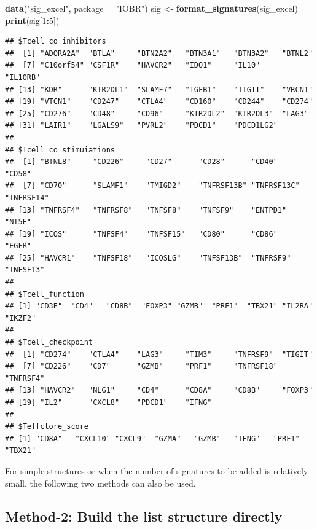 \documentclass[
  12pt,
]{book}
\newenvironment{Shaded}{\begin{snugshade}}{\end{snugshade}}
\newcommand{\AttributeTok}[1]{\textcolor[rgb]{0.13,0.29,0.53}{#1}}
\newcommand{\DecValTok}[1]{\textcolor[rgb]{0.00,0.00,0.81}{#1}}
\newcommand{\FunctionTok}[1]{\textcolor[rgb]{0.13,0.29,0.53}{\textbf{#1}}}
\newcommand{\NormalTok}[1]{#1}
\newcommand{\OtherTok}[1]{\textcolor[rgb]{0.56,0.35,0.01}{#1}}
\newcommand{\SpecialCharTok}[1]{\textcolor[rgb]{0.81,0.36,0.00}{\textbf{#1}}}
\newcommand{\StringTok}[1]{\textcolor[rgb]{0.31,0.60,0.02}{#1}}
\begin{document}
\begin{Shaded}
\begin{Highlighting}[]
\FunctionTok{data}\NormalTok{(}\StringTok{"sig\_excel"}\NormalTok{, }\AttributeTok{package =} \StringTok{"IOBR"}\NormalTok{)}
\NormalTok{sig }\OtherTok{\textless{}{-}} \FunctionTok{format\_signatures}\NormalTok{(sig\_excel)}
\FunctionTok{print}\NormalTok{(sig[}\DecValTok{1}\SpecialCharTok{:}\DecValTok{5}\NormalTok{])}
\end{Highlighting}
\end{Shaded}

\begin{verbatim}
## $Tcell_co_inhibitors
##  [1] "ADORA2A"  "BTLA"     "BTN2A2"   "BTN3A1"   "BTN3A2"   "BTNL2"   
##  [7] "C10orf54" "CSF1R"    "HAVCR2"   "IDO1"     "IL10"     "IL10RB"  
## [13] "KDR"      "KIR2DL1"  "SLAMF7"   "TGFB1"    "TIGIT"    "VRCN1"   
## [19] "VTCN1"    "CD247"    "CTLA4"    "CD160"    "CD244"    "CD274"   
## [25] "CD276"    "CD48"     "CD96"     "KIR2DL2"  "KIR2DL3"  "LAG3"    
## [31] "LAIR1"    "LGALS9"   "PVRL2"    "PDCD1"    "PDCD1LG2"
## 
## $Tcell_co_stimuiations
##  [1] "BTNL8"     "CD226"     "CD27"      "CD28"      "CD40"      "CD58"     
##  [7] "CD70"      "SLAMF1"    "TMIGD2"    "TNFRSF13B" "TNFRSF13C" "TNFRSF14" 
## [13] "TNFRSF4"   "TNFRSF8"   "TNFSF8"    "TNFSF9"    "ENTPD1"    "NT5E"     
## [19] "ICOS"      "TNFSF4"    "TNFSF15"   "CD80"      "CD86"      "EGFR"     
## [25] "HAVCR1"    "TNFSF18"   "ICOSLG"    "TNFSF13B"  "TNFRSF9"   "TNFSF13"  
## 
## $Tcell_function
## [1] "CD3E"  "CD4"   "CD8B"  "FOXP3" "GZMB"  "PRF1"  "TBX21" "IL2RA" "IKZF2"
## 
## $Tcell_checkpoint
##  [1] "CD274"    "CTLA4"    "LAG3"     "TIM3"     "TNFRSF9"  "TIGIT"   
##  [7] "CD226"    "CD7"      "GZMB"     "PRF1"     "TNFRSF18" "TNFRSF4" 
## [13] "HAVCR2"   "NLG1"     "CD4"      "CD8A"     "CD8B"     "FOXP3"   
## [19] "IL2"      "CXCL8"    "PDCD1"    "IFNG"    
## 
## $Teffctore_score
## [1] "CD8A"   "CXCL10" "CXCL9"  "GZMA"   "GZMB"   "IFNG"   "PRF1"   "TBX21"
\end{verbatim}

For simple structures or when the number of signatures to be added is relatively small, the following two methods can also be used.

\hypertarget{method-2-build-the-list-structure-directly}{%
\subsection{Method-2: Build the list structure directly}\label{method-2-build-the-list-structure-directly}}
\end{document}
